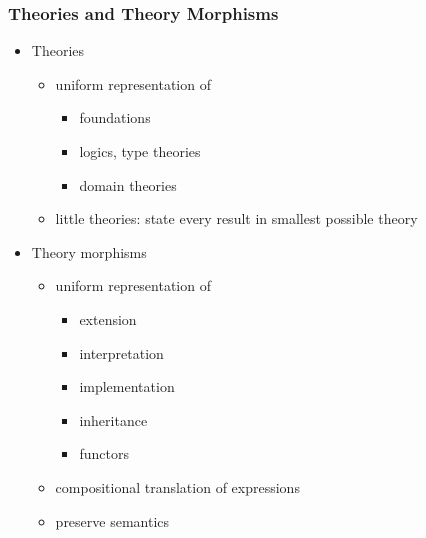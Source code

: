 \documentclass{beamer}
\begin{document}
\begin{frame}\frametitle{Theories and Theory Morphisms}
\begin{itemize}
\item Theories
   \begin{itemize}
    \item uniform representation of
	   \begin{itemize}
	     \item foundations
	     \item logics, type theories
	     \item domain theories 
	    \end{itemize}
    \item little theories: state every result in smallest possible theory
   \end{itemize}

\item Theory morphisms
   \begin{itemize}
    \item uniform representation of
	   \begin{itemize}
	     \item extension 
	     \item interpretation 
	     \item implementation 
	     \item inheritance 
	     \item functors 
	    \end{itemize}
    \item compositional translation of expressions
    \item preserve semantics
  \end{itemize}
\end{itemize}
\end{frame}
\end{document}
